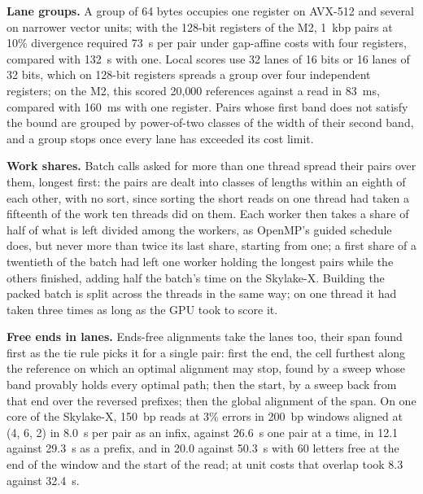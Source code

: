 \documentclass[10pt]{article}
\begin{document}
\textbf{Lane groups.} A group of 64 bytes occupies one register on AVX-512 and several on narrower vector units; with the 128-bit registers of the M2, 1~kbp pairs at 10\% divergence required 73~\textmu s per pair under gap-affine costs with four registers, compared with 132~\textmu s with one. Local scores use 32 lanes of 16 bits or 16 lanes of 32 bits, which on 128-bit registers spreads a group over four independent registers; on the M2, this scored 20{,}000 references against a read in 83~ms, compared with 160~ms with one register. Pairs whose first band does not satisfy the bound are grouped by power-of-two classes of the width of their second band, and a group stops once every lane has exceeded its cost limit.

\textbf{Work shares.} Batch calls asked for more than one thread spread their pairs over them, longest first: the pairs are dealt into classes of lengths within an eighth of each other, with no sort, since sorting the short reads on one thread had taken a fifteenth of the work ten threads did on them. Each worker then takes a share of half of what is left divided among the workers, as OpenMP's guided schedule does, but never more than twice its last share, starting from one; a first share of a twentieth of the batch had left one worker holding the longest pairs while the others finished, adding half the batch's time on the Skylake-X. Building the packed batch is split across the threads in the same way; on one thread it had taken three times as long as the GPU took to score it.

\textbf{Free ends in lanes.} Ends-free alignments take the lanes too, their span found first as the tie rule picks it for a single pair: first the end, the cell furthest along the reference on which an optimal alignment may stop, found by a sweep whose band provably holds every optimal path; then the start, by a sweep back from that end over the reversed prefixes; then the global alignment of the span. On one core of the Skylake-X, 150~bp reads at 3\% errors in 200~bp windows aligned at (4, 6, 2) in 8.0~\textmu s per pair as an infix, against 26.6~\textmu s one pair at a time, in 12.1 against 29.3~\textmu s as a prefix, and in 20.0 against 50.3~\textmu s with 60 letters free at the end of the window and the start of the read; at unit costs that overlap took 8.3 against 32.4~\textmu s.
\end{document}
